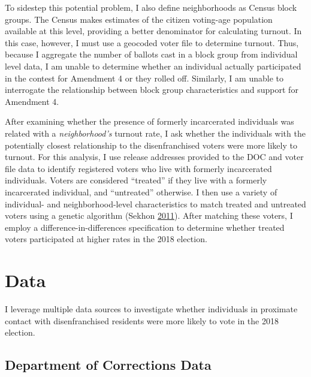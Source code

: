 \documentclass[
  12pt,
]{article}
\begin{document}
To sidestep this potential problem, I also define neighborhoods as Census block groups. The Census makes estimates of the citizen voting-age population available at this level, providing a better denominator for calculating turnout. In this case, however, I must use a geocoded voter file to determine turnout. Thus, because I aggregate the number of ballots cast in a block group from individual level data, I am unable to determine whether an individual actually participated in the contest for Amendment 4 or they rolled off. Similarly, I am unable to interrogate the relationship between block group characteristics and support for Amendment 4.

After examining whether the presence of formerly incarcerated individuals was related with a \emph{neighborhood's} turnout rate, I ask whether the individuals with the potentially closest relationship to the disenfranchised voters were more likely to turnout. For this analysis, I use release addresses provided to the DOC and voter file data to identify registered voters who live with formerly incarcerated individuals. Voters are considered ``treated'' if they live with a formerly incarcerated individual, and ``untreated'' otherwise. I then use a variety of individual- and neighborhood-level characteristics to match treated and untreated voters using a genetic algorithm (Sekhon \protect\hyperlink{ref-Sekhon2011}{2011}). After matching these voters, I employ a difference-in-differences specification to determine whether treated voters participated at higher rates in the 2018 election.

\hypertarget{data}{%
\section*{Data}\label{data}}

I leverage multiple data sources to investigate whether individuals in proximate contact with disenfranchised residents were more likely to vote in the 2018 election.

\hypertarget{department-of-corrections-data}{%
\subsection*{Department of Corrections Data}\label{department-of-corrections-data}}
\end{document}
